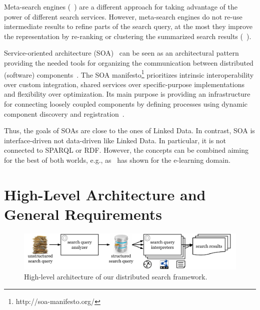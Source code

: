 Meta-search engines (\eg~\cite{liebel2004harvester,gulli2005building}) are a different approach for taking advantage of the power of different search services.
However, meta-search engines do not re-use intermediate results to refine parts of the search query, at the most they improve the representation by re-ranking or clustering the summarized search results (\eg~\cite{carpineto10metasearchclustering}).

Service-oriented architecture (SOA)~\cite{Gartner96,OASIS06} can be seen as an architectural pattern providing the needed tools for organizing the communication between distributed (software) components~\cite{bell2009soa}.
The SOA manifesto\footnote{http://soa-manifesto.org/} prioritizes intrinsic interoperability over custom integration, shared services over specific-purpose implementations and flexibility over optimization. 
Its main purpose is providing an infrastructure for connecting loosely coupled components by defining processes using dynamic component discovery and registration~\cite{erl2008soa}.

Thus, the goals of SOAs are close to the ones of Linked Data.
In contrast, SOA is interface-driven not data-driven like Linked Data. 
In particular, it is not connected to SPARQL or RDF.
However, the concepts can be combined aiming for the best of both worlds, e.g., as~\cite{yu2011linked} has shown for the e-learning domain.


\section{High-Level Architecture and General Requirements}\label{chafedsearch:sec:architecture}
\begin{figure}[t]
\centering
\includegraphics[width=\textwidth]{part_03/SEMANTiCS_architecture/highlevelarchitecture2}
\caption{High-level architecture of our distributed search framework.}
\label{fig:highlevelarchitecture}
\end{figure}


